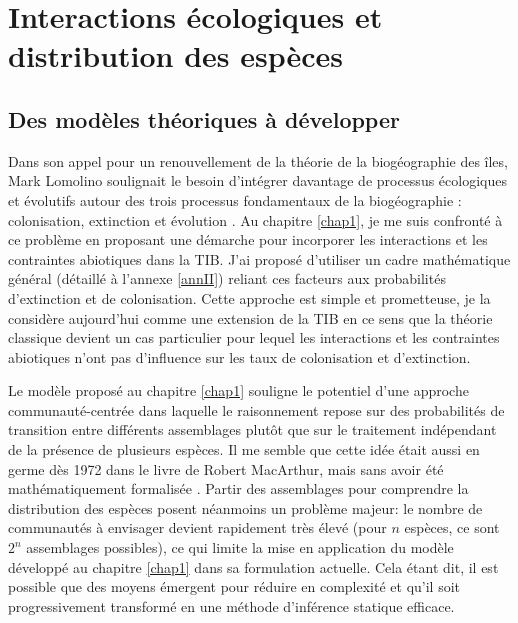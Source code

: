 \section*{Interactions écologiques et distribution des
espèces}\label{interactions-uxe9cologiques-et-distribution-des-espuxe8ces}

\subsection*{Des modèles théoriques à
développer}\label{des-moduxe8les-thuxe9oriques-uxe0-duxe9velopper}

Dans son appel pour un renouvellement de la théorie de la biogéographie
des îles, Mark Lomolino soulignait le besoin d'intégrer davantage de
processus écologiques et évolutifs autour des trois processus
fondamentaux de la biogéographie : colonisation, extinction et évolution
\citep{Lomolino2000}. Au chapitre \ref{chap1}, je me suis confronté à ce
problème en proposant une démarche pour incorporer les interactions et
les contraintes abiotiques dans la TIB. J'ai proposé d'utiliser un cadre
mathématique général (détaillé à l'annexe \ref{annII}) reliant ces
facteurs aux probabilités d'extinction et de colonisation. Cette
approche est simple et prometteuse, je la considère aujourd'hui comme
une extension de la TIB en ce sens que la théorie classique devient un
cas particulier pour lequel les interactions et les contraintes
abiotiques n'ont pas d'influence sur les taux de colonisation et
d'extinction.

Le modèle proposé au chapitre \ref{chap1} souligne le potentiel d'une
approche communauté-centrée dans laquelle le raisonnement repose sur des
probabilités de transition entre différents assemblages
\citep{Cazelles2016a} plutôt que sur le traitement indépendant de la
présence de plusieurs espèces. Il me semble que cette idée était aussi
en germe dès 1972 dans le livre de Robert MacArthur, mais sans avoir été
mathématiquement formalisée \citep{macarthur1972geographical}. Partir
des assemblages pour comprendre la distribution des espèces posent
néanmoins un problème majeur: le nombre de communautés à envisager
devient rapidement très élevé (pour \(n\) espèces, ce sont \(2^n\)
assemblages possibles), ce qui limite la mise en application du modèle
développé au chapitre \ref{chap1} dans sa formulation actuelle. Cela
étant dit, il est possible que des moyens émergent pour réduire en
complexité et qu'il soit progressivement transformé en une méthode
d'inférence statique efficace.

